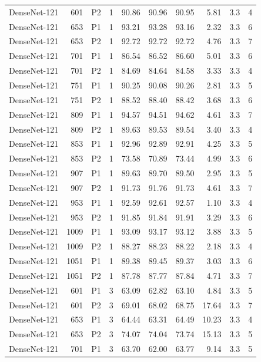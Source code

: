 {\begin{longtable}{lrllrrrrrr}
DenseNet-121 & 601 & P2 & 1 & 90.86 & 90.96 & 90.95 & 5.81 & 3.3 & 4 \\
DenseNet-121 & 653 & P1 & 1 & 93.21 & 93.28 & 93.16 & 2.32 & 3.3 & 6 \\
DenseNet-121 & 653 & P2 & 1 & 92.72 & 92.72 & 92.72 & 4.76 & 3.3 & 7 \\
DenseNet-121 & 701 & P1 & 1 & 86.54 & 86.52 & 86.60 & 5.01 & 3.3 & 6 \\
DenseNet-121 & 701 & P2 & 1 & 84.69 & 84.64 & 84.58 & 3.33 & 3.3 & 4 \\
DenseNet-121 & 751 & P1 & 1 & 90.25 & 90.08 & 90.26 & 2.81 & 3.3 & 5 \\
DenseNet-121 & 751 & P2 & 1 & 88.52 & 88.40 & 88.42 & 3.68 & 3.3 & 6 \\
DenseNet-121 & 809 & P1 & 1 & 94.57 & 94.51 & 94.62 & 4.61 & 3.3 & 7 \\
DenseNet-121 & 809 & P2 & 1 & 89.63 & 89.53 & 89.54 & 3.40 & 3.3 & 4 \\
DenseNet-121 & 853 & P1 & 1 & 92.96 & 92.89 & 92.91 & 4.25 & 3.3 & 5 \\
DenseNet-121 & 853 & P2 & 1 & 73.58 & 70.89 & 73.44 & 4.99 & 3.3 & 6 \\
DenseNet-121 & 907 & P1 & 1 & 89.63 & 89.70 & 89.50 & 2.95 & 3.3 & 5 \\
DenseNet-121 & 907 & P2 & 1 & 91.73 & 91.76 & 91.73 & 4.61 & 3.3 & 7 \\
DenseNet-121 & 953 & P1 & 1 & 92.59 & 92.61 & 92.57 & 1.10 & 3.3 & 4 \\
DenseNet-121 & 953 & P2 & 1 & 91.85 & 91.84 & 91.91 & 3.29 & 3.3 & 6 \\
DenseNet-121 & 1009 & P1 & 1 & 93.09 & 93.17 & 93.12 & 3.88 & 3.3 & 5 \\
DenseNet-121 & 1009 & P2 & 1 & 88.27 & 88.23 & 88.22 & 2.18 & 3.3 & 4 \\
DenseNet-121 & 1051 & P1 & 1 & 89.38 & 89.45 & 89.37 & 3.03 & 3.3 & 6 \\
DenseNet-121 & 1051 & P2 & 1 & 87.78 & 87.77 & 87.84 & 4.71 & 3.3 & 7 \\
DenseNet-121 & 601 & P1 & 3 & 63.09 & 62.82 & 63.10 & 4.84 & 3.3 & 5 \\
DenseNet-121 & 601 & P2 & 3 & 69.01 & 68.02 & 68.75 & 17.64 & 3.3 & 7 \\
DenseNet-121 & 653 & P1 & 3 & 64.44 & 63.31 & 64.49 & 10.23 & 3.3 & 4 \\
DenseNet-121 & 653 & P2 & 3 & 74.07 & 74.04 & 73.74 & 15.13 & 3.3 & 5 \\
DenseNet-121 & 701 & P1 & 3 & 63.70 & 62.00 & 63.77 & 9.14 & 3.3 & 5 \\

\end{longtable}}

